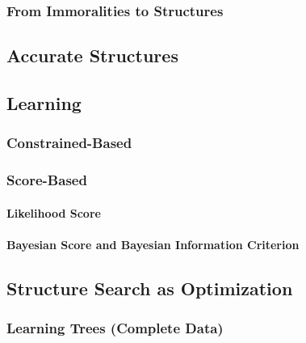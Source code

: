             \subsubsection{From Immoralities to Structures} %

        \subsection{Accurate Structures} %

        \subsection{Learning} %

            \subsubsection{Constrained-Based} %

            \subsubsection{Score-Based} %

                \paragraph{Likelihood Score} %

                \paragraph{Bayesian Score and Bayesian Information Criterion} %

        \subsection{Structure Search as Optimization} %

            \subsubsection{Learning Trees (Complete Data)} %

